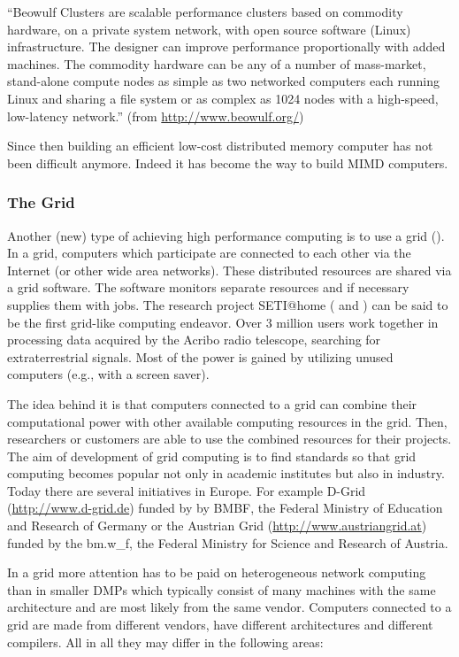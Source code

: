 ``Beowulf Clusters are scalable performance clusters based on commodity
hardware, on a private system network, with open source software
(Linux) infrastructure. The designer can improve performance
proportionally with added machines. The commodity hardware can be any
of a number of mass-market, stand-alone compute nodes as simple as two
networked computers each running Linux and sharing a file system or as
complex as 1024 nodes with a high-speed, low-latency network.'' (from
\url{http://www.beowulf.org/})

Since then building an efficient low-cost distributed memory computer
has not been difficult anymore. Indeed it has become the way to build
MIMD computers.

\subsubsection{The Grid}

Another (new) type of achieving high performance computing is to use a
grid (\cite{foster99gbf}). In a grid, computers which participate are
connected to each other
via the Internet (or other wide area networks). These distributed
resources are shared via a 
grid software. The software monitors separate resources and if
necessary supplies them with jobs. The research project SETI@home
(\cite{korpela01shm} and \cite{anderson02she}) can
be said to be the first grid-like computing endeavor. Over 3 million
users work together in processing data acquired by the Acribo radio
telescope, searching for extraterrestrial signals. Most of the power is
gained by utilizing unused computers (e.g., with a screen saver).

The idea behind it is that computers connected to a grid can combine
their computational power with other available computing resources in the
grid. Then, researchers or customers are able to use the combined
resources for their projects. The aim of development of grid computing
is to find standards so that grid computing becomes popular
not only in academic institutes but also in industry. Today
there are several initiatives in Europe. For example D-Grid
(\url{http://www.d-grid.de}) funded
by by BMBF, the Federal Ministry of Education and Research of Germany
or the Austrian Grid (\url{http://www.austriangrid.at}) funded by the
bm.w\_f, the Federal Ministry for Science and Research of
Austria.

In a grid more attention has to be paid on heterogeneous network
computing than in smaller DMPs which typically consist of many machines
with the same architecture and are most likely from the same
vendor. Computers connected to a grid are made 
from different vendors, have different architectures and different
compilers. All in all they may differ in the following areas:

